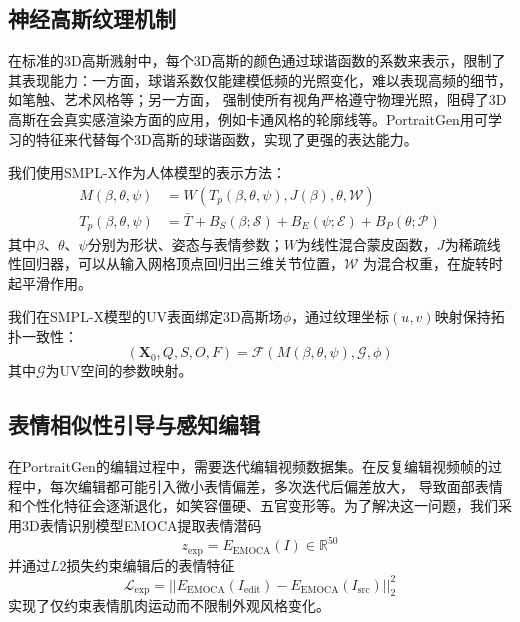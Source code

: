 \subsection{神经高斯纹理机制}

在标准的3D高斯溅射中，每个3D高斯的颜色通过球谐函数的系数来表示，限制了其表现能力：一方面，球谐系数仅能建模低频的光照变化，难以表现高频的细节，如笔触、艺术风格等；另一方面，
强制使所有视角严格遵守物理光照，阻碍了3D高斯在会真实感渲染方面的应用，例如卡通风格的轮廓线等。PortraitGen用可学习的特征来代替每个3D高斯的球谐函数，实现了更强的表达能力。

我们使用SMPL-X\cite{pavlakos2019expressive}作为人体模型的表示方法：
\begin{align}
    M(\beta,\theta,\psi)&=W(T_p(\beta,\theta,\psi), J(\beta),\theta, \mathcal{W})\\
    T_p(\beta,\theta,\psi)&=\bar{T}+B_S(\beta;\mathcal{S})+B_E(\psi;\mathcal{E})+B_P(\theta;\mathcal{P})
\end{align}
其中$\beta$、$\theta$、$\psi$分别为形状、姿态与表情参数；$W$为线性混合蒙皮函数，$J$为稀疏线性回归器，可以从输入网格顶点回归出三维关节位置，$\mathcal{W}$
为混合权重，在旋转时起平滑作用。

我们在SMPL-X模型的UV表面绑定3D高斯场$\phi$，通过纹理坐标$(u,v)$映射保持拓扑一致性：
\begin{equation}
    (\symbf{X}_0,Q,S,O,F)=\mathcal{F}(M(\beta,\theta,\psi),\mathcal{G},\phi)
\end{equation}
其中$\mathcal{G}$为UV空间的参数映射。

\subsection{表情相似性引导与感知编辑}

在PortraitGen的编辑过程中，需要迭代编辑视频数据集。在反复编辑视频帧的过程中，每次编辑都可能引入微小表情偏差，多次迭代后偏差放大，
导致面部表情和个性化特征会逐渐退化，如笑容僵硬、五官变形等。为了解决这一问题，我们采用3D表情识别模型EMOCA\cite{danvevcek2022emoca}提取表情潜码
\begin{equation}
    z_{\text{exp}}=E_{\text{EMOCA}}(I) \in \mathbb{R} ^{50}
\end{equation}
并通过$L2$损失约束编辑后的表情特征
\begin{equation}
    \mathcal{L}_{\text{exp}}=||E_{\text{EMOCA}}(I_{\text{edit}})-E_{\text{EMOCA}}(I_{\text{src}})||_2^2
\end{equation}
实现了仅约束表情肌肉运动而不限制外观风格变化。

